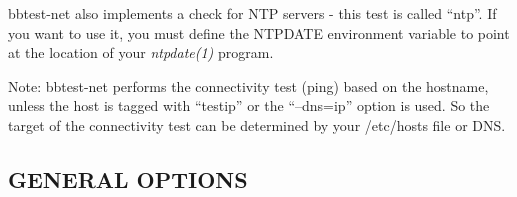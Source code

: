   bbtest-net also implements a check for NTP servers - this test is
  called ``ntp''. If you want to use it, you must define the NTPDATE
  environment variable to point at the location of your
  \emph{ntpdate(1)} program. 



  Note: bbtest-net performs the connectivity test (ping) based on the
  hostname, unless the host is tagged with ``testip'' or the
  ``--dns=ip'' option is used. So the target of the connectivity test
  can be determined by your /etc/hosts file or DNS. 



 
\subsection{GENERAL OPTIONS}


